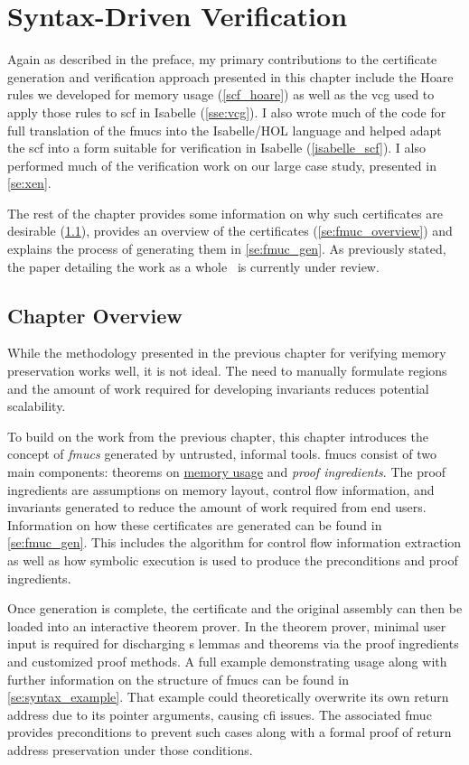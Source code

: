 \chapter{Syntax-Driven Verification}\label{ch:syntax}
Again as described in the preface,
my primary contributions to the certificate generation and verification approach%
presented in this chapter include the Hoare rules we developed
for memory usage (\cref{scf_hoare})
as well as the \ac{vcg} used to apply those rules
to \ac{scf} in Isabelle (\cref{sse:vcg}).
I also wrote much of the code for full translation of the \acp{fmuc}
into the Isabelle/HOL language
and helped adapt the \ac{scf} into a form suitable for verification
in Isabelle (\cref{isabelle_scf}).
I also performed much of the verification work on our large case study,
presented in \cref{se:xen}.

The rest of the chapter provides some information
on why such certificates are desirable (\cref{se:fmuc_motivation}),
provides an overview of the certificates (\cref{se:fmuc_overview})
and explains the process of generating them in \cref{se:fmuc_gen}.
As previously stated,
the paper detailing the work as a whole~\citep{popl2019underreview}
is currently under review.

\section{Chapter Overview}\label{se:fmuc_motivation}
While the methodology presented in the previous chapter
for verifying memory preservation works well, it is not ideal.
The need to manually formulate regions
and the amount of work required for developing invariants
reduces potential scalability.

To build on the work from the previous chapter,
this chapter introduces the concept of \emph{\acfp{fmuc}}
generated by untrusted, informal tools.
\Acp{fmuc} consist of two main components:
theorems on \hyperref[ch:memory]{memory usage} and \emph{proof ingredients}.%
The proof ingredients are assumptions on memory layout,
control flow information, and invariants
generated to reduce the amount of work required from end users.
Information on how these certificates are generated
can be found in \cref{se:fmuc_gen}.
This includes the algorithm for control flow information extraction
as well as how symbolic execution is used
to produce the preconditions and proof ingredients.

Once generation is complete, the certificate and the original assembly%
can then be loaded into an interactive theorem prover.
In the theorem prover,
minimal user input is required for discharging s lemmas and theorems
via the proof ingredients and customized proof methods.%
%
A full example demonstrating usage along with 
further information on the structure of \acp{fmuc}
can be found in \cref{se:syntax_example}.
That example could theoretically overwrite
its own return address due to its pointer arguments, causing \ac{cfi} issues.
The associated \ac{fmuc} provides preconditions to prevent such cases
along with a formal proof of return address preservation under those conditions.

